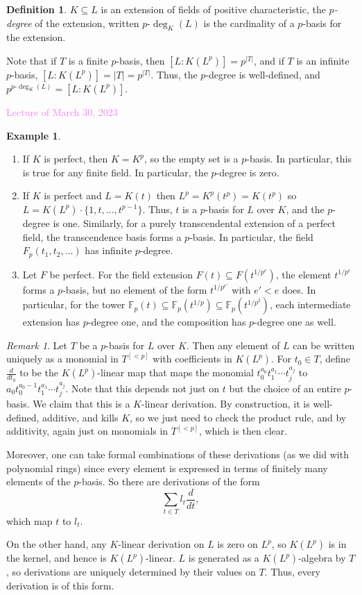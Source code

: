 \documentclass{amsart}[12pt]
\newcommand{\Mar}[1]{\textcolor{violet}{Lecture of March #1, 2023}}
\newcommand{\F}{\mathbb{F}}
\numberwithin{equation}{section}
\theoremstyle{plain} %
\theoremstyle{definition}
\newtheorem{defn}[equation]{Definition}
\newtheorem{ex}[equation]{Example}
\theoremstyle{remark}
\newtheorem{rem}[equation]{Remark}
\begin{document}
\begin{defn} $K\subseteq L$ is an extension of fields of positive characteristic, the \emph{$p$-degree} of the extension, written $p$-$\deg_K(L)$  is the cardinality of a $p$-basis for the extension. 
\end{defn}


Note that if $T$ is a finite $p$-basis, then $[L:K(L^p)] = p^{|T|}$, and if $T$ is an infinite $p$-basis, $[L:K(L^p)] = |T| =p^{|T|}$. Thus, the $p$-degree is well-defined, and $p^{p\text{-}\deg_K(L)} = [L:K(L^p)]$.

\Mar{30}

\begin{ex}
\begin{enumerate}
\item If $K$ is perfect, then $K=K^p$, so the empty set is a $p$-basis. In particular, this is true for any finite field. In particular, the $p$-degree is zero.
\item If $K$ is perfect and $L=K(t)$ then $L^p = K^p(t^p)=K(t^p)$ so $L = K(L^p) \cdot \{1,t,\dots,t^{p-1}\}$. Thus, $t$ is a $p$-basis for $L$ over $K$, and the $p$-degree is one. Similarly, for a purely transcendental extension of a perfect field, the transcendence basis forms a $p$-basis. In particular, the field $F_p(t_1,t_2,\dots)$ has infinite $p$-degree.
\item Let $F$ be perfect. For the field extension $F(t) \subseteq F(t^{1/p^e})$, the element $t^{1/p^e}$ forms a $p$-basis, but no element of the form $t^{1/p^{e'}}$ with $e'<e$ does. In particular, for the tower $\F_p(t) \subseteq \F_p(t^{1/p})  \subseteq \F_p(t^{1/p^2})$, each intermediate extension has $p$-degree one, and the composition has $p$-degree one as well. 
\end{enumerate}
\end{ex}

\begin{rem} Let $T$ be a $p$-basis for $L$ over $K$. Then any element of $L$ can be written uniquely as a monomial in $T^{[<p]}$ with coefficients in $K(L^p)$. For $t_0\in T$, define $\frac{d}{dt_0}$ to be the $K(L^p)$-linear map that maps the monomial $t_0^{a_0} t_1^{a_1} \cdots t_j^{a_j}$ to $a_0 t_0^{a_0-1}  t_1^{a_1} \cdots t_j^{a_j}$. Note that this depends not just on $t$ but the choice of an entire $p$-basis. We claim that this is a $K$-linear derivation. By construction, it is well-defined, additive, and kills $K$, so we just need to check the product rule, and by additivity, again just on monomials in $T^{[<p]}$, which is then clear.

Moreover, one can take formal combinations of these derivations (as we did with polynomial rings) since every element is expressed in terms of finitely many elements of the $p$-basis. So there are derivations of the form 
\[ \sum_{t\in T} l_t \frac{d}{dt},\]
which map $t$ to $l_t$.

On the other hand, any $K$-linear derivation on $L$ is zero on $L^p$, so $K(L^p)$ is in the kernel, and hence is $K(L^p)$-linear. $L$ is generated as a $K(L^p)$-algebra by $T$, so derivations are uniquely determined by their values on $T$. Thus, every derivation is of this form.
\end{rem}
\end{document}
